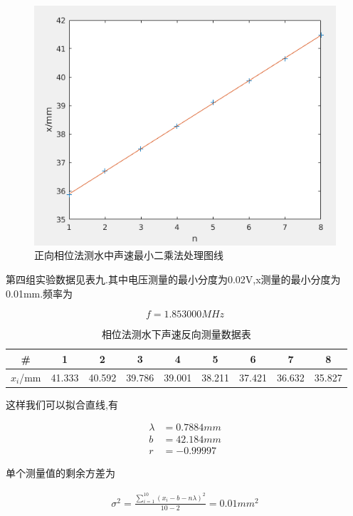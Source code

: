 \documentclass[a4paper,10pt,notitlepage]{article}
\begin{document}
\begin{figure}[h]
	\includegraphics[scale=0.6]{f5.png}
	\caption{正向相位法测水中声速最小二乘法处理图线}
\end{figure}

	第四组实验数据见表九.其中电压测量的最小分度为0.02V,x测量的最小分度为0.01mm.频率为
	
\begin{equation}
	f = 1.853000 MHz
\end{equation}

\begin{table}[htbp]
\centering

	\begin{tabular}{|c|c|c|c|c|c|c|c|c|}
	\hline
	\# & 1 & 2 & 3 & 4 & 5 & 6 & 7 & 8 \\
	\hline
	$x_{i}$/mm & 41.333 & 40.592 & 39.786 & 39.001 & 38.211 & 37.421 & 36.632 & 35.827 \\
	\hline
	\end{tabular}
	\caption{相位法测水下声速反向测量数据表}

\end{table}

	这样我们可以拟合直线,有
	
\begin{align}
	\lambda &= 0.7884mm \\
	b &= 42.184 mm \\
	r &= -0.99997
\end{align}

	单个测量值的剩余方差为
	
\begin{align}
	\sigma ^ 2 = \frac{\sum_{i = 1}^{10}(x_i - b - n\lambda )^2}{10 - 2} = 0.01 mm^2 
\end{align}
\end{document}
